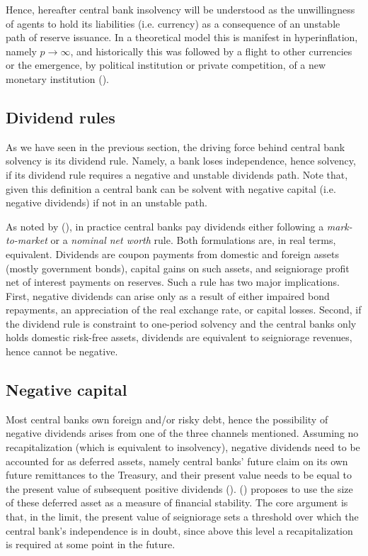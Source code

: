 \documentclass[american]{scrartcl}
\newcommand{\citein}[1]{\citeauthor{#1} (\citeyear{#1})}
\begin{document}
Hence, hereafter central bank insolvency will be understood as the unwillingness of agents to hold its liabilities (i.e. currency) as a consequence of an unstable path of reserve issuance. In a theoretical model this is manifest in hyperinflation, namely $p \xrightarrow{} \infty$, and historically this was followed by a flight to other currencies or the emergence, by political institution or private competition, of a new monetary institution (\cite{Flandreau2007}). %

\subsection{Dividend rules}

As we have seen in the previous section, the driving force behind central bank solvency is its dividend rule. Namely, a bank loses independence, hence solvency, if its dividend rule requires a negative and unstable dividends path. Note that, given this definition a central bank can be solvent with negative capital (i.e. negative dividends) if not in an unstable path.

As noted by \citein{Hall2015}, in practice central banks pay dividends either following a \textit{mark-to-market} or a \textit{nominal net worth} rule. Both formulations are, in real terms, equivalent. Dividends are coupon payments from domestic and foreign assets (mostly government bonds), capital gains on such assets, and seigniorage profit net of interest payments on reserves. Such a rule has two major implications. First, negative dividends can arise only as a result of either impaired bond repayments, an appreciation of the real exchange rate, or capital losses. Second, if the dividend rule is constraint to one-period solvency and the central banks only holds domestic risk-free assets, dividends are equivalent to seigniorage revenues, hence cannot be negative.

\subsection{Negative capital}

Most central banks own foreign and/or risky debt, hence the possibility of negative dividends arises from one of the three channels mentioned. Assuming no recapitalization (which is equivalent to insolvency), negative dividends need to be accounted for as deferred assets, namely central banks' future claim on its own future remittances to the Treasury, and their present value needs to be equal to the present value of subsequent positive dividends (\cite{Archer2013}). \citein{Reis2015} proposes to use the size of these deferred asset as a measure of financial stability. The core argument is that, in the limit, the present value of seigniorage sets a threshold over which the central bank's independence is in doubt, since above this level a recapitalization is required at some point in the future.
\end{document}

